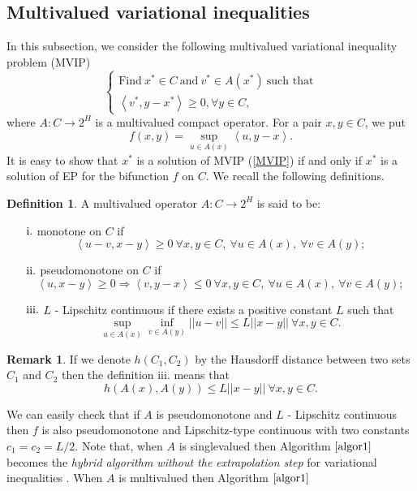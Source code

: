 \documentclass{aims}
\theoremstyle{definition}
\newtheorem{definition}[theorem]{Definition}
\newtheorem{remark}{Remark}
\begin{document}
\subsection{Multivalued variational inequalities}
In this subsection, we consider the following multivalued variational inequality problem (MVIP)
\begin{equation}\label{MVIP}
\begin{cases}
\mbox{Find}~x^*\in C ~\mbox{and}~v^*\in A(x^*)~\mbox{such that}\\
\left\langle v^*,y-x^*\right\rangle\ge 0,\forall y\in C, 
\end{cases}
\end{equation}
where $A:C\to 2^H$ is a multivalued compact operator. For a pair $x,y\in C$, we put 
\begin{equation}\label{eq:f}
f(x,y)=\underset{u\in A(x)}{\sup}\left\langle u,y-x\right\rangle.
\end{equation}
It is easy to show that $x^*$ is a solution of MVIP (\ref{MVIP}) if and only if $x^*$ is a solution of EP for the bifunction $f$ on $C$. We recall the following 
definitions.
\begin{definition}
A multivalued operator $A:C\to 2^H$ is said to be: 
\begin{itemize}
\item [$\rm i.$] monotone on $C$ if 
$$\left\langle u-v,x-y\right\rangle\ge 0~\forall x,y\in C,~\forall u\in A(x),~\forall v\in A(y); $$
\item [$\rm ii.$] pseudomonotone on $C$ if 
$$\left\langle u,x-y\right\rangle\ge 0\Longrightarrow \left\langle v,y-x\right\rangle\le 0 ~\forall x,y\in C,~\forall u\in A(x),~\forall v\in A(y); $$
\item [$\rm iii.$] $L$ - Lipschitz continuous if there exists a positive constant $L$ such that 
$$\underset{u\in A(x)}{\sup}\underset{v\in A(y)}{\inf}||u-v||\le L||x-y||~\forall x,y\in C.$$
\end{itemize}
\end{definition}
\begin{remark}
If we denote $h(C_1,C_2)$ by the Hausdorff distance between two sets $C_1$ and $C_2$ then the definition iii. means that
$$h(A(x),A(y))\le L||x-y||~\forall x,y\in C.$$
\end{remark}
We can easily check that if $A$ is pseudomonotone and $L$ - Lipschitz continuous then $f$ is also pseudomonotone and Lipschitz-type 
continuous with two constants $c_1=c_2=L/2$. Note that, when $A$ is singlevalued then Algorithm $\ref{algor1}$ becomes the \textit{hybrid 
algorithm without the extrapolation step} for variational inequalities \cite{MS2015}. When $A$ is multivalued then Algorithm $\ref{algor1}$ 
\end{document}
